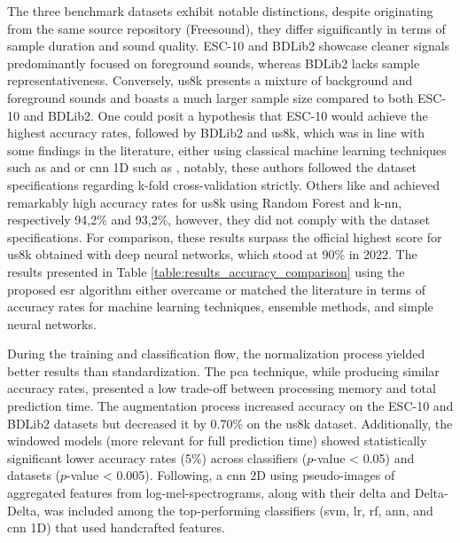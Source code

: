 The three benchmark datasets exhibit notable distinctions, despite originating from the same source repository (Freesound), they differ significantly in terms of sample duration and sound quality. ESC-10 and BDLib2 showcase cleaner signals predominantly focused on foreground sounds, whereas BDLib2 lacks sample representativeness. Conversely, \gls{us8k} presents a mixture of background and foreground sounds and boasts a much larger sample size compared to both ESC-10 and BDLib2. One could posit a hypothesis that ESC-10 would achieve the highest accuracy rates, followed by BDLib2 and \gls{us8k}, which was in line with some findings in the literature, either using classical machine learning techniques such as \textcite{Silva2019} and \textcite{Bountourakis2019} or \gls{cnn} 1D such as \textcite{Vandendriessche2021}, notably, these authors followed the dataset specifications regarding k-fold cross-validation strictly. Others like \textcite{Lhoest2021} and \textcite{Luz2021} achieved remarkably high accuracy rates for \gls{us8k} using Random Forest and \gls{k-nn}, respectively 94,2\% and 93,2\%, however, they did not comply with the dataset specifications. For comparison, these results surpass the official highest score for \gls{us8k} obtained with deep neural networks, which stood at 90\% in 2022. The results presented in Table \ref{table:results_accuracy_comparison} using the proposed \gls{esr} algorithm either overcame or matched the literature in terms of accuracy rates for machine learning techniques, ensemble methods, and simple neural networks.


During the training and classification flow, the normalization process yielded better results than standardization. The \gls{pca} technique, while producing similar accuracy rates, presented a low trade-off between processing memory and total prediction time. The augmentation process increased accuracy on the ESC-10 and BDLib2 datasets but decreased it by 0.70\% on the \gls{us8k} dataset. Additionally, the windowed models (more relevant for full prediction time) showed statistically significant lower accuracy rates (5\%) across classifiers ($p$-value < 0.05) and datasets ($p$-value < 0.005). Following, a \gls{cnn} 2D using pseudo-images of aggregated features from log-mel-spectrograms, along with their delta and Delta-Delta, was included among the top-performing classifiers (\gls{svm}, \gls{lr}, \gls{rf}, \gls{ann}, and \gls{cnn} 1D) that used handcrafted features.


